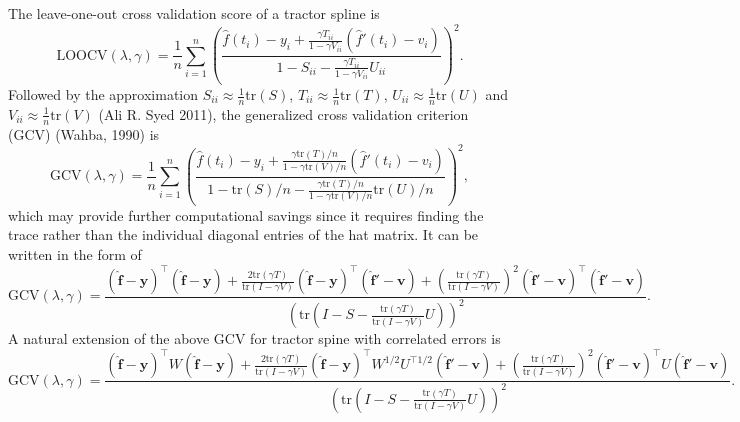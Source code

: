 The leave-one-out cross validation score of a tractor spline is
\begin{equation}
\mbox{LOOCV}(\lambda,\gamma)=\frac{1}{n}\sum_{i=1}^{n}\left( \frac{\hat{f}(t_i)-y_i+\frac{\gamma T_{ii}}{1-\gamma V_{ii}}(\hat{f}'(t_i)-v_i)}{1-S_{ii}-\frac{\gamma T_{ii}}{1-\gamma V_{ii}}U_{ii}} \right)^2.
\end{equation}
Followed by the approximation $S_{ii}\approx\frac{1}{n}\mbox{tr}(S)$, $T_{ii}\approx\frac{1}{n}\mbox{tr}(T)$, $U_{ii}\approx\frac{1}{n}\mbox{tr}(U)$ and $V_{ii}\approx\frac{1}{n}\mbox{tr}(V)$ (Ali R. Syed 2011), the generalized cross validation criterion (GCV) (Wahba, 1990) is
\begin{equation}
\mbox{GCV}(\lambda,\gamma)=\frac{1}{n}\sum_{i=1}^{n}\left( \frac{\hat{f}(t_i)-y_i+ \frac{\gamma\mbox{tr}(T)/n}{1-\gamma \mbox{tr}(V)/n}(\hat{f}'(t_i)-v_i)}{1-\mbox{tr}(S)/n-\frac{\gamma\mbox{tr}(T)/n}{1-\gamma \mbox{tr}(V)/n} \mbox{tr}(U)/n} \right)^2,
\end{equation}
which may provide further computational savings since it requires finding the trace rather than the individual diagonal entries of the hat matrix. It can be written in the form of
\begin{equation}
\mbox{GCV}(\lambda,\gamma)=\frac{(\mathbf{\hat{f}}-\mathbf{y})^\top (\mathbf{\hat{f}}-\mathbf{y})+\frac{2\mbox{tr}(\gamma T)}{\mbox{tr}(I-\gamma V)}(\mathbf{\hat{f}}-\mathbf{y})^\top (\mathbf{\hat{f}}'-\mathbf{v}) + \left( \frac{\mbox{tr}(\gamma T)}{\mbox{tr}(I-\gamma V)} \right)^2 (\mathbf{\hat{f}}'-\mathbf{v})^\top (\mathbf{\hat{f}}'-\mathbf{v})}{\left( \mbox{tr}(I-S-\frac{\mbox{tr}(\gamma T)}{\mbox{tr}(I-\gamma V)}U) \right)^2}.
\end{equation}
A natural extension of the above GCV for tractor spine with correlated errors is
\begin{equation}
\mbox{GCV}(\lambda,\gamma)=\frac{(\mathbf{\hat{f}}-\mathbf{y})^\top W(\mathbf{\hat{f}}-\mathbf{y})+\frac{2\mbox{tr}(\gamma T)}{\mbox{tr}(I-\gamma V)}(\mathbf{\hat{f}}-\mathbf{y})^\top W^{1/2}U^{\top 1/2}(\mathbf{\hat{f}}'-\mathbf{v}) + \left( \frac{\mbox{tr}(\gamma T)}{\mbox{tr}(I-\gamma V)} \right)^2 (\mathbf{\hat{f}}'-\mathbf{v})^\top U(\mathbf{\hat{f}}'-\mathbf{v})}{\left( \mbox{tr}(I-S-\frac{\mbox{tr}(\gamma T)}{\mbox{tr}(I-\gamma V)}U) \right)^2}.
\end{equation}




